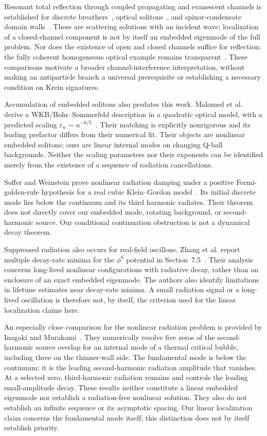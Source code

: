 Resonant total reflection through coupled propagating and evanescent
channels is established for discrete breathers~\cite{Flach2003},
optical solitons~\cite{Flach2005}, and spinor-condensate domain
walls~\cite{Watabe2012}. These are scattering solutions with an incident
wave; localization of a closed-channel component is not by itself an
embedded eigenmode of the full problem. Nor does the existence of open
and closed channels suffice for reflection: the fully coherent homogeneous
optical example remains transparent~\cite{Flach2005}.
These comparisons motivate a broader channel-interference interpretation,
without making an antiparticle branch a universal prerequisite or
establishing a necessary condition on Krein signatures.

Accumulation of embedded solitons also predates this work. Malomed et al.
derive a WKB/Bohr--Sommerfeld description in a quadratic optical model,
with a predicted scaling $\varepsilon_n\sim n^{-6/5}$~\cite{Malomed2005}.
Their matching is explicitly nonrigorous and its leading prefactor differs
from their numerical fit. Their objects are nonlinear embedded solitons;
ours are linear internal modes on changing Q-ball backgrounds. Neither
the scaling parameters nor their exponents can be identified merely from
the existence of a sequence of radiation cancellations.

Soffer and Weinstein prove nonlinear radiation damping under a positive
Fermi-golden-rule hypothesis for a real cubic Klein--Gordon
model~\cite{SofferWeinstein1999}. Its initial discrete mode lies below the
continuum and its third harmonic radiates. Their theorem does not directly
cover our embedded mode, rotating background, or second-harmonic source.
Our conditional continuation obstruction is not a dynamical decay theorem.

Suppressed radiation also occurs for real-field oscillons. Zhang et al.
report multiple decay-rate minima for the $\phi^6$ potential in
Section~7.5~\cite{ZhangOscillons2020}. Their analysis concerns long-lived
nonlinear configurations with radiative decay, rather than an enclosure
of an exact embedded eigenmode. The authors also identify limitations in
lifetime estimates near decay-rate minima. A small radiation signal or
a long-lived oscillation is therefore not, by itself, the criterion
used for the linear localization claims here.

An especially close comparison for the nonlinear radiation problem is
provided by Inagaki and Murakami~\cite{InagakiMurakami2026}.
They numerically resolve five zeros of the second-harmonic source overlap
for an internal mode of a thermal critical bubble, including three on
the thinner-wall side. The fundamental mode is below the continuum;
it is the leading second-harmonic radiation amplitude that vanishes.
At a selected zero, third-harmonic radiation remains and controls the
leading small-amplitude decay. These results neither constitute a linear
embedded eigenmode nor establish a radiation-free nonlinear solution.
They also do not establish an infinite sequence or its asymptotic spacing.
Our linear localization claim concerns the fundamental mode itself;
this distinction does not by itself establish priority.

